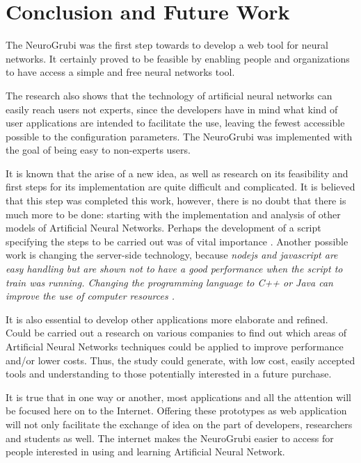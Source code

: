 \section{Conclusion and Future Work}

The NeuroGrubi was the first step towards to develop a web tool for 
neural networks. It certainly proved to be feasible by enabling people and 
organizations to have access a simple and free neural networks tool.

The research also shows that the technology of artificial neural networks can 
easily reach users not experts, since the developers have in mind what kind of 
user applications are intended to facilitate the use, leaving the fewest 
accessible possible to the configuration parameters. The NeuroGrubi was 
implemented with the goal of being easy to  non-experts users.

It is known that the arise of a new idea, as well as research on its 
feasibility and first steps for its implementation are quite difficult and 
complicated. It is believed that this step was completed this work, however, 
there is no doubt that there is much more to be done: starting with the 
implementation and analysis of other models of Artificial Neural Networks. 
Perhaps the development of a script specifying the steps to be carried out was 
of vital importance . Another possible work is changing the server-side 
technology, because \em{nodejs} and \em{javascript} are easy handling but are 
shown not to have a good performance when the script to train was running. 
Changing the programming language to \em{C++} or \em{Java} can improve the use 
of computer resources .

It is also essential to develop other applications more elaborate and refined. 
Could be carried out a research on various companies to find out which areas 
of Artificial Neural Networks techniques could be applied to improve 
performance and/or lower costs. Thus, the study could generate, with low cost, 
easily accepted tools and understanding to those potentially interested in 
a future purchase.

It is true that in one way or another, most applications and all the attention 
will be focused here on to the Internet. Offering these prototypes as web 
application will not only facilitate the exchange of idea on the part of 
developers, researchers and students as well. The internet makes the NeuroGrubi 
easier to access for people interested in using and learning Artificial Neural 
Network.